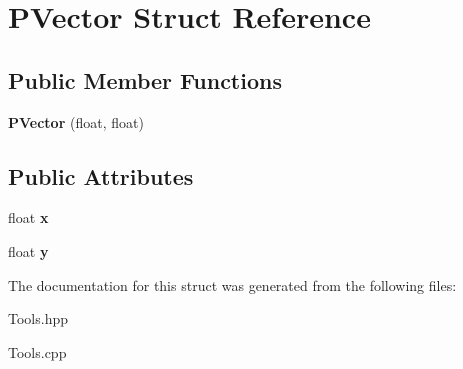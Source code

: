 \hypertarget{struct_p_vector}{}\section{P\+Vector Struct Reference}
\label{struct_p_vector}
\subsection*{Public Member Functions}
\begin{DoxyCompactItemize}
\item 
\hypertarget{struct_p_vector_aaed7f72779101199eb499892e000f7e8}{}\label{struct_p_vector_aaed7f72779101199eb499892e000f7e8} 
{\bfseries P\+Vector} (float, float)
\end{DoxyCompactItemize}
\subsection*{Public Attributes}
\begin{DoxyCompactItemize}
\item 
\hypertarget{struct_p_vector_ae8b1d40fd11089e7949cb333cf949d13}{}\label{struct_p_vector_ae8b1d40fd11089e7949cb333cf949d13} 
float {\bfseries x}
\item 
\hypertarget{struct_p_vector_a63d91c43b923e9e63f1fb1e0598b5962}{}\label{struct_p_vector_a63d91c43b923e9e63f1fb1e0598b5962} 
float {\bfseries y}
\end{DoxyCompactItemize}


The documentation for this struct was generated from the following files\+:\begin{DoxyCompactItemize}
\item 
Tools.\+hpp\item 
Tools.\+cpp\end{DoxyCompactItemize}
